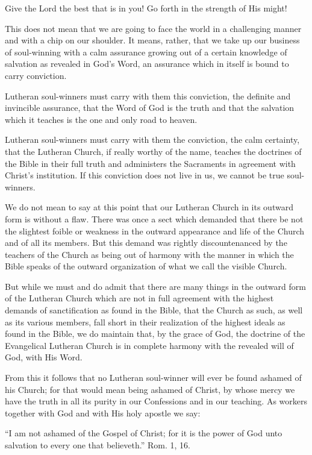 \documentclass[
]{book}
\begin{document}
Give the Lord the best that is in you! Go forth in the strength of His might!

This does not mean that we are going to face the world in a challenging manner and with a chip on our shoulder. It means, rather, that we take up our business of soul-winning with a calm assurance growing out of a certain knowledge of salvation as revealed in God's Word, an assurance which in itself is bound to carry conviction.

Lutheran soul-winners must carry with them this conviction, the definite and invincible assurance, that the Word of God is the truth and that the salvation which it teaches is the one and only road to heaven.

Lutheran soul-winners must carry with them the conviction, the calm certainty, that the Lutheran Church, if really worthy of the name, teaches the doctrines of the Bible in their full truth and administers the Sacraments in agreement with Christ's institution. If this conviction does not live in us, we cannot be true soul-winners.

We do not mean to say at this point that our Lutheran Church in its outward form is without a flaw. There was once a sect which demanded that there be not the slightest foible or weakness in the outward appearance and life of the Church and of all its members. But this demand was rightly discountenanced by the teachers of the Church as being out of harmony with the manner in which the Bible speaks of the outward organization of what we call the visible Church.

But while we must and do admit that there are many things in the outward form of the Lutheran Church which are not in full agreement with the highest demands of sanctification as found in the Bible, that the Church as such, as well as its various members, fall short in their realization of the highest ideals as found in the Bible, we do maintain that, by the grace of God, the doctrine of the Evangelical Lutheran Church is in complete harmony with the revealed will of God, with His Word.

From this it follows that no Lutheran soul-winner will ever be found ashamed of his Church; for that would mean being ashamed of Christ, by whose mercy we have the truth in all its purity in our Confessions and in our teaching. As workers together with God and with His holy apostle we say:

``I am not ashamed of the Gospel of Christ; for it is the power of God unto salvation to every one that believeth.'' Rom. 1, 16.
\end{document}
